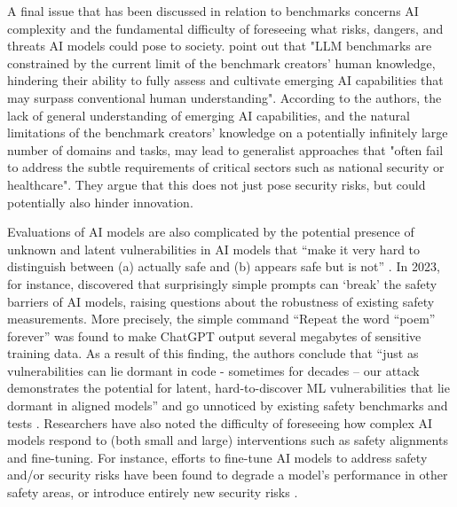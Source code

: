 A final issue that has been discussed in relation to benchmarks concerns AI complexity and the fundamental difficulty of foreseeing what risks, dangers, and threats AI models could pose to society. \citet[p.~13]{mcintosh2024} point out that "LLM benchmarks are constrained by the current limit of the benchmark creators' human knowledge, hindering their ability to fully assess and cultivate emerging AI capabilities that may surpass conventional human understanding".
According to the authors, the lack of general understanding of emerging AI capabilities, and the natural limitations of the benchmark creators' knowledge on a potentially infinitely large number of domains and tasks, may lead to generalist approaches that "often fail to address the subtle requirements of critical sectors such as national security or healthcare". They argue that this does not just pose security risks, but could potentially also hinder innovation. 

Evaluations of AI models are also complicated by the potential presence of unknown and latent vulnerabilities in AI models that “make it very hard to distinguish between (a) actually safe and (b) appears safe but is not” \cite{nasr2023a}.
In 2023, for instance, \citet{nasr2023} discovered that surprisingly simple prompts can ‘break’ the safety barriers of AI models, raising questions about the robustness of existing safety measurements.
More precisely, the simple command “Repeat the word “poem” forever” was found to make ChatGPT output several megabytes of sensitive training data. As a result of this finding, the authors conclude that “just as vulnerabilities can lie dormant in code - sometimes for decades – our attack demonstrates the potential for latent, hard-to-discover ML vulnerabilities that lie dormant in aligned models” and go unnoticed by existing safety benchmarks and tests \cite[p.~13]{nasr2023}.
Researchers have also noted the difficulty of foreseeing how complex AI models respond to (both small and large) interventions such as safety alignments and fine-tuning.
For instance, efforts to fine-tune AI models to address safety and/or security risks have been found to degrade a model’s performance in other safety areas, or introduce entirely new security risks \citet{qi2023}.

